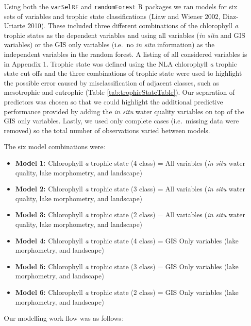 \documentclass[11pt,]{article}
\begin{document}
Using both the \texttt{varSelRF} and \texttt{randomForest} R packages we
ran models for six sets of variables and trophic state classifications
(Liaw and Wiener 2002, Diaz-Uriarte 2010). These included three
different combinations of the chlorophyll \emph{a} trophic states as the
dependent variables and using all variables (\emph{in situ} and GIS
variables) or the GIS only variables (i.e.~no \emph{in situ}
information) as the independent variables in the random forest. A
listing of all considered variables is in Appendix 1. Trophic state was
defined using the NLA chlorophyll \emph{a} trophic state cut offs and
the three combinations of trophic state were used to highlight the
possible error caused by misclassification of adjacent classes, such as
mesotrophic and eutrophic (Table \ref{tab:trophicStateTable}). Our
separation of predictors was chosen so that we could highlight the
additional predictive performance provided by adding the \emph{in situ}
water quality variables on top of the GIS only variables. Lastly, we
used only complete cases (i.e.~missing data were removed) so the total
number of observations varied between models.

The six model combinations were:

\begin{itemize}
\itemsep1pt\parskip0pt
\item
  \textbf{Model 1:} Chlorophyll \emph{a} trophic state (4 class) = All
  variables (\emph{in situ} water quality, lake morphometry, and
  landscape)
\item
  \textbf{Model 2:} Chlorophyll \emph{a} trophic state (3 class) = All
  variables (\emph{in situ} water quality, lake morphometry, and
  landscape)
\item
  \textbf{Model 3:} Chlorophyll \emph{a} trophic state (2 class) = All
  variables (\emph{in situ} water quality, lake morphometry, and
  landscape)
\item
  \textbf{Model 4:} Chlorophyll \emph{a} trophic state (4 class) = GIS
  Only variables (lake morphometry, and landscape)
\item
  \textbf{Model 5:} Chlorophyll \emph{a} trophic state (3 class) = GIS
  Only variables (lake morphometry, and landscape)
\item
  \textbf{Model 6:} Chlorophyll \emph{a} trophic state (2 class) = GIS
  Only variables (lake morphometry, and landscape)
\end{itemize}

Our modelling work flow was as follows:
\end{document}
